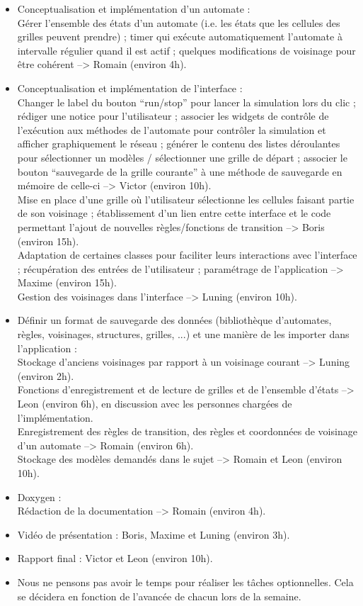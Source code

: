 \documentclass[11pt]{article}
\begin{document}
\begin{itemize}
    \item Conceptualisation et implémentation d'un automate : \\
    Gérer l’ensemble des états d’un automate (i.e. les états que les cellules des grilles peuvent prendre) ; timer qui exécute automatiquement l’automate à intervalle régulier quand il est actif ; quelques modifications de voisinage pour être cohérent --> Romain (environ 4h).
    \bigskip
    \item Conceptualisation et implémentation de l'interface : \\
    Changer le label du bouton “run/stop” pour lancer la simulation lors du clic ; rédiger une notice pour l’utilisateur ; associer les widgets de contrôle de l’exécution aux méthodes de l’automate pour contrôler la simulation et afficher graphiquement le réseau ; générer le contenu des listes déroulantes pour sélectionner un modèles / sélectionner une grille de départ ; associer le bouton “sauvegarde de la grille courante” à une méthode de sauvegarde en mémoire de celle-ci --> Victor (environ 10h). \\
    Mise en place d’une grille où l’utilisateur sélectionne les cellules faisant partie de son voisinage ; établissement d’un lien entre cette interface et le code permettant l’ajout de nouvelles règles/fonctions de transition --> Boris (environ 15h). \\
    Adaptation de certaines classes pour faciliter leurs interactions avec l'interface ; récupération des entrées de l'utilisateur ; paramétrage de l'application --> Maxime (environ 15h). \\
    Gestion des voisinages dans l'interface --> Luning (environ 10h).
    \bigskip
    \item Définir un format de sauvegarde des données (bibliothèque d'automates, règles, voisinages, structures, grilles, ...) et une manière de les importer dans l'application : \\
    Stockage d'anciens voisinages par rapport à un voisinage courant --> Luning (environ 2h). \\
    Fonctions d'enregistrement et de lecture de grilles et de l'ensemble d'états --> Leon (environ 6h), en discussion avec les personnes chargées de l'implémentation. \\
    Enregistrement des règles de transition, des règles et coordonnées de voisinage d'un automate --> Romain (environ 6h).\\
    Stockage des modèles demandés dans le sujet --> Romain et Leon (environ 10h).
    \bigskip
    \item Doxygen : \\
    Rédaction de la documentation --> Romain (environ 4h).
    \bigskip
    \item Vidéo de présentation : Boris, Maxime et Luning (environ 3h).
    \bigskip
    \item Rapport final : Victor et Leon (environ 10h).
    \bigskip
    \item Nous ne pensons pas avoir le temps pour réaliser les tâches optionnelles. Cela se décidera en fonction de l'avancée de chacun lors de la semaine.
\end{itemize}
\end{document}
